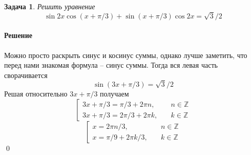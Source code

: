 \documentclass[a4paper,12pt]{report}
\newcommand{\fancy}[1]{{\mathbb{#1}}}
\newtheorem{problem}{Задача}[chapter]
\newenvironment{sol}{\paragraph{Решение}}{}
\begin{document}
	\begin{problem}
		Решить уравнение
		\[
		\sin{2x}\cos{(x+\pi/3)}+\sin{(x+\pi/3)}\cos{2x}=\sqrt{3}/2
		\]
	\end{problem}
	\begin{sol}
		Можно просто раскрыть синус и косинус суммы, однако лучше заметить, что перед нами знакомая формула -- синус суммы. Тогда вся левая часть сворачивается
		\[
		\sin{(3x+\pi/3)}=\sqrt{3}/2
		\]
		Решая относительно $3x+\pi/3$ получаем
		\begin{equation*}
			\left[ 
			\begin{array}{ll}
				3x+\pi/3=\pi/3+2\pi n, &\quad n\in \fancy{Z}\\
				3x+\pi/3=2\pi/3+2\pi k, &\quad k\in \fancy{Z}
			\end{array}
			\right.
		\end{equation*}
		\begin{equation*}
			\left[ 
			\begin{array}{ll}
				x=2\pi n/3, &\quad n\in \fancy{Z}\\
				x=\pi/9+2\pi k/3, &\quad k \in \fancy{Z}
			\end{array}
			\right.
		\end{equation*}
		\qed
	\end{sol}
\end{document}
